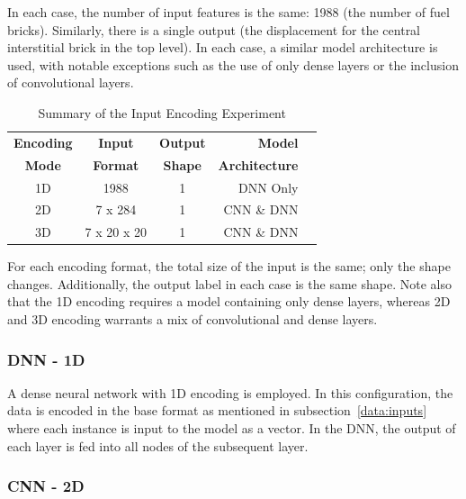 \noindent
In each case, the number of input features is the same: 1988 (the number of fuel bricks). Similarly, there is a single output (the displacement for the central interstitial brick in the top level). In each case, a similar model architecture is used, with notable exceptions such as the use of only dense layers or the inclusion of convolutional layers.

\begin{table}[h!]
	\begin{center}
		
		\begin{tabular}{c|c|c|r|c} %
			\textbf{Encoding} & \textbf{Input} & \textbf{Output} & \textbf{Model} \\
			
			\textbf{Mode} & \textbf{Format} & \textbf{Shape} & \textbf{Architecture} \\
			\hline
			1D & 1988 & 1 & DNN Only \\
			2D & 7 x 284 &  1 & CNN \& DNN \\
			3D & 7 x 20 x 20 &  1 & CNN \& DNN \\
			
		\end{tabular}
		\caption{Summary of the Input Encoding Experiment} {For each encoding format, the total size of the input is the same; only the shape changes. Additionally, the output label in each case is the same shape. Note also that the 1D encoding requires a model containing only dense layers, whereas 2D and 3D encoding warrants a mix of convolutional and dense layers. }
		\label{tab:encodings}
	\end{center}
\end{table}

\subsubsection{DNN - 1D}

A dense neural network with 1D encoding is employed. In this configuration, the data is encoded in the base format as mentioned in subsection~\ref{data:inputs} where each instance is input to the model as a vector. In the DNN, the output of each layer is fed into all nodes of the subsequent layer.

\subsubsection{CNN - 2D}

